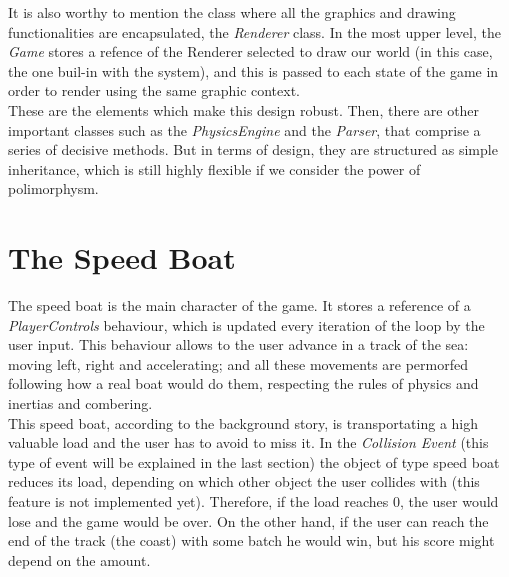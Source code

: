 \documentclass[]{article}
\begin{document}
It is also worthy to mention the class where all the graphics and drawing functionalities are encapsulated, the \emph{Renderer} class. In the most upper level, the \emph{Game} stores a refence of
the Renderer selected to draw our world (in this case, the one buil-in with the system), and this is passed to each state of the game in order to render using the same graphic context. \\

These are the elements which make this design robust. Then, there are other important classes such as the \emph{PhysicsEngine} and the \emph{Parser}, that comprise a series of decisive methods. But
in terms of design, they are structured as simple inheritance, which is still highly flexible if we consider the power of polimorphysm.



\section{The Speed Boat}

The speed boat is the main character of the game. It stores a reference of a \emph{PlayerControls} behaviour, which is updated every iteration of the loop by the user input. This behaviour allows
to the user advance in a track of the sea: moving left, right and accelerating; and all these movements are permorfed following how a real boat would do them, respecting the rules of physics and
inertias and combering.\\

This speed boat, according to the background story, is transportating a high valuable load and the user has to avoid to miss it. In the \emph{Collision Event} (this type of event will be explained in the last section)
the object of type speed boat reduces its load, depending on which other object the user collides with (this feature is not implemented yet). Therefore, if the load reaches 0, the user would lose
and the game would be over. On the other hand, if the user can reach the end of the track (the coast) with some batch he would win, but his score might depend on the amount.


\end{document}
